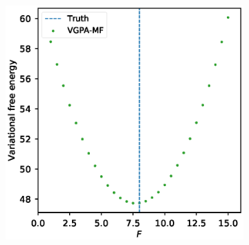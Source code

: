 \begin{frame}[t]
\begin{figure}
\begin{subfigure}[b]{0.32\textwidth}
            \label{fig-lorenz-96-parameters-boxplot}
        \end{subfigure}
        \begin{subfigure}[b]{0.32\textwidth}
            \includegraphics[width=\textwidth]{graphics/lorenz-96-parameters-grid-search}
            \label{fig-lorenz-96-parameters-grid-search}
        \end{subfigure}
        \label{fig-lorenz-96-parameters-group}    
    \end{figure}
\end{frame}

